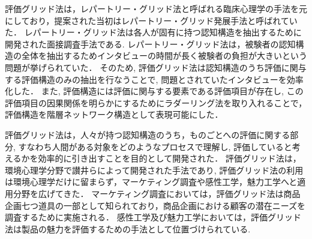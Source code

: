 \documentclass[syuuron]{kuee}
\begin{document}
		評価グリッド法は，レパートリー・グリッド法\cite{rg1}と呼ばれる臨床心理学の手法を元にしており，提案された当初はレパートリー・グリッド発展手法と呼ばれていた．
		レパートリー・グリッド法は各人が固有に持つ認知構造を抽出するために開発された面接調査手法である. 
		レパートリー・グリッド法は，被験者の認知構造の全体を抽出するためインタビューの時間が長く被験者の負担が大きいという問題が挙げられていた．
		そのため, 評価グリッド法は認知構造のうち評価に関与する評価構造のみの抽出を行なうことで, 問題とされていたインタビューを効率化した．
		また, 評価構造には評価に関与する要素である評価項目が存在し, この評価項目の因果関係を明らかにするためにラダーリング法を取り入れることで，
		評価構造を階層ネットワーク構造として表現可能にした．
		
		評価グリッド法は，人々が持つ認知構造のうち，ものごとへの評価に関する部分, 
		すなわち人間がある対象をどのようなプロセスで理解し, 評価していると考えるかを効率的に引き出すことを目的として開発された．
		評価グリッド法は，環境心理学分野で讃井らによって開発された手法であり, 
		評価グリッド法の利用は環境心理学だけに留まらず，マーケティング調査や感性工学，魅力工学へと適用分野を広げてきた．
		マーケティング調査においては，評価グリッド法は商品企画七つ道具の一部として知られており，商品企画における顧客の潜在ニーズを調査するために実施される．
		感性工学及び魅力工学においては，評価グリッド法は製品の魅力を評価するための手法として位置づけられている. 
		
\end{document}
